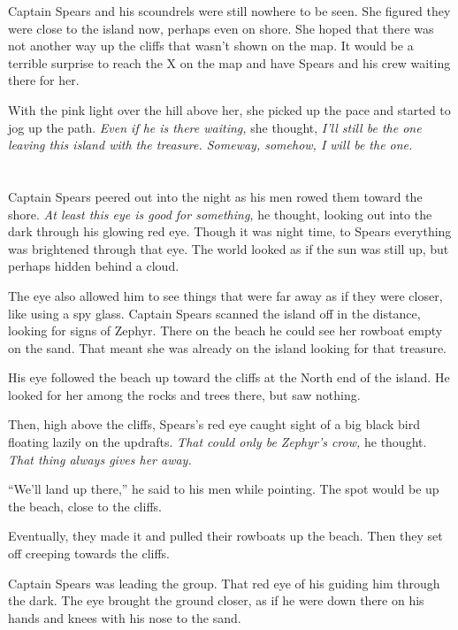 \documentclass[12pt]{extbook}
\begin{document}
  Captain Spears and his scoundrels were still nowhere to be seen. She
  figured they were close to the island now, perhaps even on shore. She
  hoped that there was not another way up the cliffs that wasn't shown on
  the map. It would be a terrible surprise to reach the X on the map and
  have Spears and his crew waiting there for her.
  
  With the pink light over the hill above her, she picked up the pace and
  started to jog up the path. \emph{Even if he is there waiting,} she
  thought, \emph{I'll still be the one leaving this island with the
  treasure. Someway, somehow, I will be the one.}
  
  \section{}\label{section-17}
  
  Captain Spears peered out into the night as his men rowed them toward
  the shore. \emph{At least this eye is good for something,} he thought,
  looking out into the dark through his glowing red eye. Though it was
  night time, to Spears everything was brightened through that eye. The
  world looked as if the sun was still up, but perhaps hidden behind a
  cloud.
  
  The eye also allowed him to see things that were far away as if they
  were closer, like using a spy glass. Captain Spears scanned the island
  off in the distance, looking for signs of Zephyr. There on the beach he
  could see her rowboat empty on the sand. That meant she was already on
  the island looking for that treasure.
  
  His eye followed the beach up toward the cliffs at the North end of the
  island. He looked for her among the rocks and trees there, but saw
  nothing.
  
  Then, high above the cliffs, Spears's red eye caught sight of a big
  black bird floating lazily on the updrafts. \emph{That could only be
  Zephyr's crow,} he thought. \emph{That thing always gives her away.}
  
  \enquote{We'll land up there,} he said to his men while pointing. The
  spot would be up the beach, close to the cliffs.
  
  Eventually, they made it and pulled their rowboats up the beach. Then
  they set off creeping towards the cliffs.
  
  Captain Spears was leading the group. That red eye of his guiding him
  through the dark. The eye brought the ground closer, as if he were down
  there on his hands and knees with his nose to the sand.
  
\end{document}

